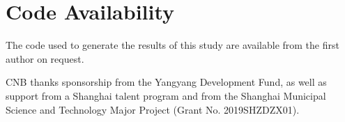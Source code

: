 \documentclass[a4paper,aps,amsmath,amssymb,twocolumn,longbibliography,,accepted=2022-05-17]{quantumarticle}
\begin{document}
\section*{Code Availability}
The code used to generate the results of this study are available from the first author on request.

\begin{acknowledgments}
CNB thanks sponsorship from the Yangyang Development Fund, as well as support from a Shanghai talent program and from the Shanghai Municipal Science and Technology Major Project (Grant No. 2019SHZDZX01).

\end{acknowledgments}




\appendix
\end{document}
